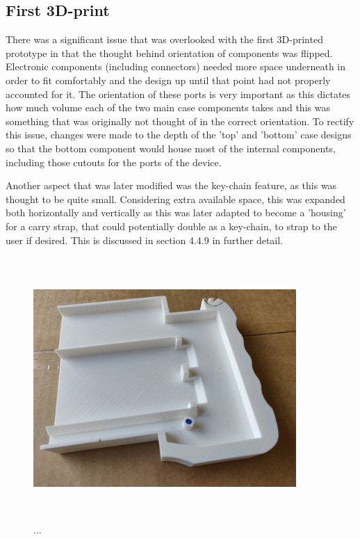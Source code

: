 \subsection{First 3D-print}

There was a significant issue that was overlooked with the first 3D-printed prototype in that the thought behind orientation of components was flipped.
Electronic components (including connectors) needed more space underneath in order to fit comfortably and the design up until that point had not properly accounted for it.
The orientation of these ports is very important as this dictates how much volume each of the two main case components takes and this was something that was originally not thought of in the correct orientation.
To rectify this issue, changes were made to the depth of the 'top' and 'bottom' case designs so that the bottom component would house most of the internal components, including those cutouts for the ports of the device.

Another aspect that was later modified was the key-chain feature, as this was thought to be quite small.
Considering extra available space, this was expanded both horizontally and vertically as this was later adapted to become a 'housing' for a carry strap, that could potentially double as a key-chain, to strap to the user if desired.
This is discussed in section 4.4.9 in further detail.

\begin{figure} [h]
    \centering
    \includegraphics[width=10cm,height=10cm,keepaspectratio]{Figures/firstprint.jpg}
    \caption{...}
    \label{fig:First}
\end{figure}

